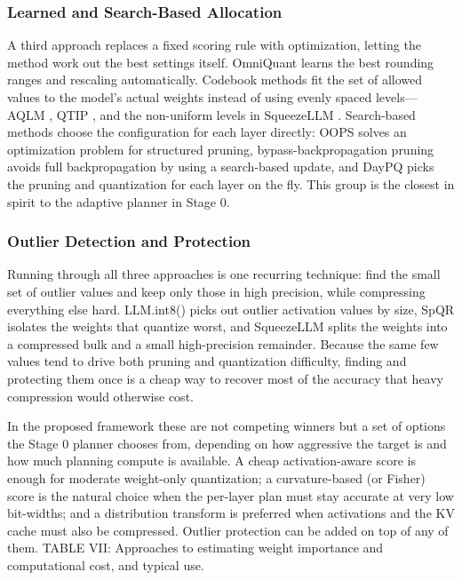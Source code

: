 \subsubsection{Learned and Search-Based Allocation}

A third approach replaces a fixed scoring rule with optimization, letting the method work out the best settings itself. OmniQuant \cite{shao2024omniquant} learns the best rounding ranges and rescaling automatically. Codebook methods fit the set of allowed values to the model's actual weights instead of using evenly spaced levels---AQLM \cite{egiazarian2024aqlm}, QTIP \cite{tseng2024qtip}, and the non-uniform levels in SqueezeLLM \cite{kim2024squeezellm}. Search-based methods choose the configuration for each layer directly: OOPS \cite{survey2026oops} solves an optimization problem for structured pruning, bypass-backpropagation pruning \cite{gao2025bypass} avoids full backpropagation by using a search-based update, and DayPQ \cite{xu2026daypq} picks the pruning and quantization for each layer on the fly. This group is the closest in spirit to the adaptive planner in Stage 0.

\subsubsection{Outlier Detection and Protection}

Running through all three approaches is one recurring technique: find the small set of outlier values and keep only those in high precision, while compressing everything else hard. LLM.int8() \cite{dettmers2022llmint8} picks out outlier activation values by size, SpQR \cite{dettmers2024spqr} isolates the weights that quantize worst, and SqueezeLLM \cite{kim2024squeezellm} splits the weights into a compressed bulk and a small high-precision remainder. Because the same few values tend to drive both pruning and quantization difficulty, finding and protecting them once is a cheap way to recover most of the accuracy that heavy compression would otherwise cost.

In the proposed framework these are not competing winners but a set of options the Stage 0 planner chooses from, depending on how aggressive the target is and how much planning compute is available. A cheap activation-aware score is enough for moderate weight-only quantization; a curvature-based (or Fisher) score is the natural choice when the per-layer plan must stay accurate at very low bit-widths; and a distribution transform is preferred when activations and the KV cache must also be compressed. Outlier protection can be added on top of any of them. TABLE VII: Approaches to estimating weight importance and computational cost, and typical use.

